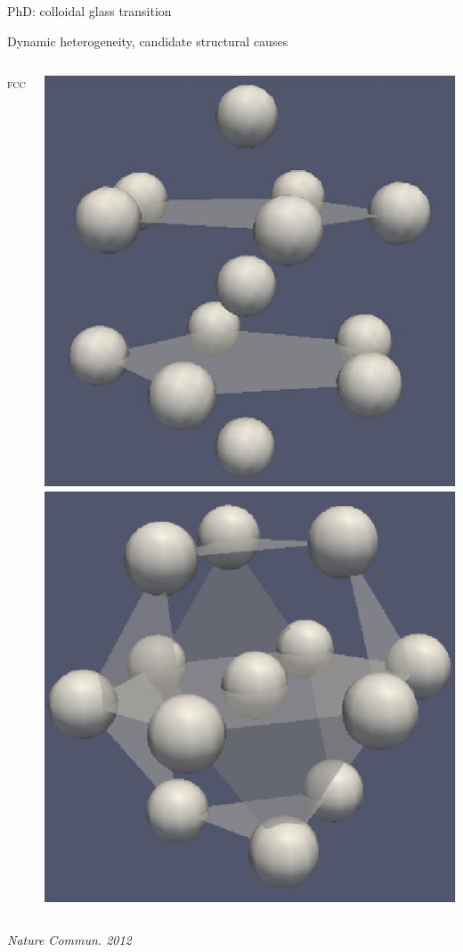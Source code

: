 \begin{frame}{PhD: colloidal glass transition}
\begin{block}{Dynamic heterogeneity, candidate structural causes}
\begin{columns}
\begin{enumerate}
\setlength{\radius}{0.3\baselineskip}
\hfill \textsc{\footnotesize fcc}
\end{enumerate}
\includegraphics[width=\textwidth]{ico_13}\\
\includegraphics[width=\textwidth]{fcc_13}
\end{columns}
\end{block}
\hfill \textit{\scriptsize Nature Commun. 2012}


\end{frame}
